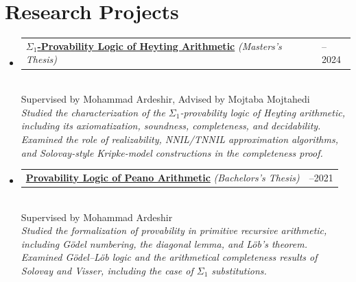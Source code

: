 \documentclass[11pt,a4paper]{article}
\makeatletter
\newcommand{\cvrow}[2]{%
  \noindent\begin{tabularx}{\textwidth}{@{}X>{\raggedleft\arraybackslash}p{0.31\textwidth}@{}}
    #1 & #2
  \end{tabularx}%
}
\makeatother
\begin{document}
\section{Research Projects}
\begin{itemize}
  \item \cvrow{\href{https://naviddejbord.github.io/research/masters-thesis/}{\textbf{$\Sigma_1$-Provability Logic of Heyting Arithmetic}} \textit{(Masters's Thesis)}}{2023--2024}\\
  Supervised by Mohammad Ardeshir, Advised by Mojtaba Mojtahedi\\
  \textit{\small{Studied the characterization of the $\Sigma_1$-provability logic of Heyting arithmetic, including its axiomatization, soundness, completeness, and decidability. Examined the role of realizability, NNIL/TNNIL approximation algorithms, and Solovay-style Kripke-model constructions in the completeness proof.}}

  \item \cvrow{\href{https://naviddejbord.github.io/research/bachelors-thesis/}{\textbf{Provability Logic of Peano Arithmetic}} \textit{(Bachelors's Thesis)}}{2020--2021}\\
  Supervised by Mohammad Ardeshir\\
  \textit{Studied the formalization of provability in primitive recursive arithmetic, including Gödel numbering, the diagonal lemma, and Löb's theorem. Examined Gödel–Löb logic and the arithmetical completeness results of Solovay and Visser, including the case of $\Sigma_1$ substitutions.}
\end{itemize}
\end{document}
